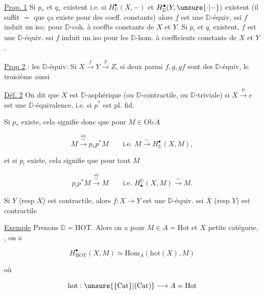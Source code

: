 \uline{Prop. 1} Si  $p_*$ et $q_*$ existent i.e. si $H^\bullet_{\mathbb D}(X,-)$ et $H^\bullet_{\mathbb D}(Y,\unsure{\cdot|-})$ existent (il suffit $=$ que ça existe pour des coeff. constants) alors $f$ est une $\mathbb D$-équiv. ssi  $f$ induit un iso. pour  $\mathbb D$-coh. à coeffts constants de $X$ et $Y$. Si $p_!$ et $q_!$ existent,  $f$ est une $\mathbb D$-équiv. ssi $f$ induit un iso pour les $\mathbb D$-hom. à coefficients constants de $X$ et $Y$.

\uline{Prop 2} :  les  $\mathbb D$-équiv. Si $X\xrightarrow{f}Y\xrightarrow{g}Z$, si deux parmi $f,g,gf$ sont des $\mathbb D$-équiv, le troisième aussi

\uline{Déf. 2} On dit que $X$  est $\mathbb D$-asphérique (ou $\mathbb D$-contractile, ou $\mathbb D$-triviale) si $X\xrightarrow p e$ est une $\mathbb D$-équivalence, i.e. si $p^*$ est pl. fid.

 Si $p_*$ existe, cela signifie donc que pour $M\in\mathrm{Ob}\,A$

\[ M\xrightarrow{\overset{\mathrm{adj}}{\sim}}p_*p^*M\qquad\text{i.e. }M\xrightarrow{\sim}H^\bullet_{\mathbb D}(X,M), \]

et si $p_!$ existe, cela signifie que pour tout $M$

\[ p_!p^*M\xrightarrow{\overset{\mathrm{adj}}{\sim}}M\qquad\text{i.e. }H_\bullet^{\mathbb D}(X,M)\xrightarrow{\sim}M. \]

  Si $Y$ \deleted{\unsure{$=$}} (resp $X$) est contractile, alors $f:X\longrightarrow Y$ est une $\mathbb D$-équiv. ssi $X$ (resp $Y$) est contractile


\uline{Exemple} Prenons $\mathbb D=\mathrm{HOT}$.  Alors on a pour $M\in A=\mathrm{Hot}$ et $X$ petite catégorie, , on a

\[ H^\bullet_{\mathrm{HOT}}(X,M)\simeq\mathrm{Hom}_A(\mathrm{hot}(X),M) \]

où

\[ \mathrm{hot}:\unsure{\{\mathrm{Cat}\}|\mathrm{(Cat)}}\longrightarrow A=\mathrm{Hot} \]

